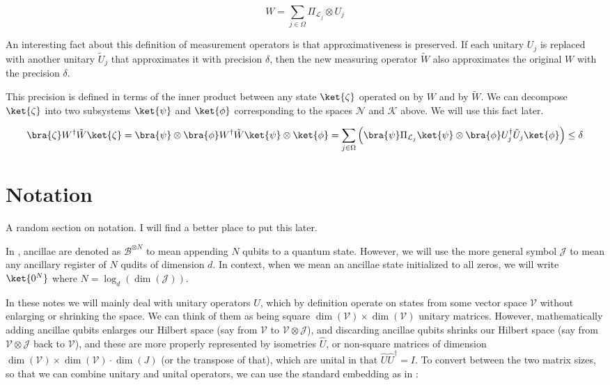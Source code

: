 \begin{equation}
W = \sum_{j \in \Omega} \Pi_{\mathcal{L}_j} \otimes U_j
\end{equation}

An interesting fact about this definition of measurement operators is
that approximativeness is preserved. If each unitary $U_j$ is replaced with
another unitary $\tilde{U}_j$ that approximates it with precision $\delta$,
then the new measuring operator $\tilde{W}$ also approximates the original
$W$ with the precision $\delta$.

This precision is defined in terms of the inner product between any state
$\ket{\zeta}$
operated
on by $W$ and by $\tilde{W}$. We can decompose $\ket{\zeta}$ into
two subsystems $\ket{\psi}$ and $\ket{\phi}$
corresponding to the spaces $\mathcal{N}$ and $\mathcal{K}$
above. We will use this fact later.

\begin{equation}
\bra{\zeta} W^{\dag} \tilde{W} \ket{\zeta} =
\bra{\psi} \otimes \bra{\phi} W^{\dag} \tilde{W} \ket{\psi} \otimes \ket{\phi} =
\sum_{j \in \Omega} \left( \bra{\psi} \Pi_{\mathcal{L}_j} \ket{\psi} \otimes
\bra{\phi} U^{\dag}_j \tilde{U}_j \ket{\phi} \right) \le \delta
\end{equation}

\section{Notation}

A random section on notation. I will find a better place to put this later.

In \cite{ksv02}, ancillae are denoted as $\mathcal{B}^{\otimes N}$ to mean
appending $N$ qubits to a quantum state. However, we will use the more general
symbol $\mathcal{J}$ to mean any ancillary register of $N$ qudits of dimension $d$.
In context,
when we mean an ancillae state initialized to all zeros, we will write
$\ket{0^N}$ where $N = \log_d(\dim(\mathcal{J}))$.

In these notes we will mainly deal with unitary operators $U$, which by
definition operate on
states from some vector space $\mathcal{V}$
without enlarging or shrinking the space.
We can think of them as being square
$\dim(\mathcal{V}) \times \dim(\mathcal{V})$
unitary matrices.
However, mathematically adding ancillae qubits enlarges our Hilbert space
(say from $\mathcal{V}$ to $\mathcal{V}\otimes \mathcal{J}$),
and discarding ancillae qubits shrinks our Hilbert space
(say from $\mathcal{V}\otimes \mathcal{J}$ back to $\mathcal{V}$),
and these are more properly represented by isometries $\hat{U}$,
or non-square matrices
of dimension
$\dim(\mathcal{V})\times \dim(\mathcal{V})\cdot\dim(J)$
(or the transpose of that), which are unital in that
$\hat{U}\hat{U}^\dagger = I$. To convert between the two matrix sizes,
so that we can combine unitary and unital operators, we can use the
standard embedding as in \cite{ksv02}:

